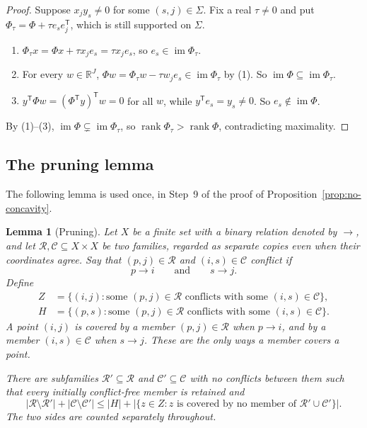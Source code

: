 \documentclass[11pt]{article}
\newtheorem{lemma}[theorem]{Lemma}
\theoremstyle{remark}
\newcommand{\abs}[1]{\lvert #1\rvert}
\DeclareMathOperator{\rank}{rank}
\DeclareMathOperator{\im}{im}
\newcommand{\R}{\mathbb R}
\begin{document}
\begin{proof}
Suppose $x_jy_s\ne0$ for some $(s,j)\in\Sigma$. Fix a real $\tau\neq0$ and put
$\Phi_\tau=\Phi+\tau e_s e_j^{\mathsf T}$, which is still supported on
$\Sigma$.
\begin{enumerate}[label=\textup{(\arabic*)},leftmargin=2.2em,itemsep=1pt]
\item $\Phi_\tau x=\Phi x+\tau x_je_s=\tau x_j e_s$, so
$e_s\in\im \Phi_\tau$.
\item For every $w\in\R^J$,
$\Phi w=\Phi_\tau w-\tau w_j e_s\in\im \Phi_\tau$ by (1). So
$\im\Phi\subseteq\im\Phi_\tau$.
\item $y^{\mathsf T}\Phi w=(\Phi^{\mathsf T}y)^{\mathsf T}w=0$ for all $w$,
while $y^{\mathsf T}e_s=y_s\ne0$. So $e_s\notin\im \Phi$.
\end{enumerate}
By (1)--(3), $\im\Phi\subsetneq\im\Phi_\tau$, so
$\rank \Phi_\tau>\rank \Phi$, contradicting maximality.
\end{proof}

\subsection{The pruning lemma}

The following lemma is used once, in Step~9 of the proof of
Proposition~\ref{prop:no-concavity}.

\begin{lemma}[Pruning]\label{lem:pruning}
Let $X$ be a finite set with a binary relation denoted by $\to$, and let
$\mathcal R,\mathcal C\subseteq X\times X$ be two families, regarded as
separate copies even when their coordinates agree. Say that
$(p,j)\in\mathcal R$ and $(i,s)\in\mathcal C$ \emph{conflict} if
\[
 p\to i\qquad\text{and}\qquad s\to j.
\]
Define
\begin{align*}
 Z&=\{(i,j):\text{some }(p,j)\in\mathcal R
       \text{ conflicts with some }(i,s)\in\mathcal C\},\\
 H&=\{(p,s):\text{some }(p,j)\in\mathcal R
       \text{ conflicts with some }(i,s)\in\mathcal C\}.
\end{align*}
A point $(i,j)$ is \emph{covered} by a member $(p,j)\in\mathcal R$ when
$p\to i$, and by a member $(i,s)\in\mathcal C$ when $s\to j$.
These are the only ways a member covers a point.

There are subfamilies $\mathcal R'\subseteq\mathcal R$ and
$\mathcal C'\subseteq\mathcal C$ with no conflicts between them such that
every initially conflict-free member is retained and
\begin{equation}\label{eq:pruning-bound}
 \abs{\mathcal R\setminus\mathcal R'}+
 \abs{\mathcal C\setminus\mathcal C'}
 \leq \abs H+
 \abs{\{z\in Z:z\text{ is covered by no member of }
                    \mathcal R'\cup\mathcal C'\}}.
\end{equation}
The two sides are counted separately throughout.
\end{lemma}
\end{document}
